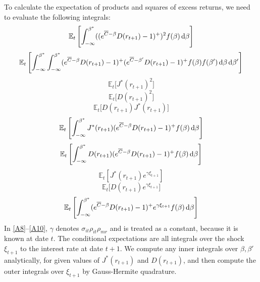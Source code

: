 \documentclass[12pt]{scrarticle}
\begin{document}
\begin{appendices}
To calculate the expectation of products and squares of excess returns, we need to evaluate the following integrals:
\begin{equation} 
    \mathbb{E}_t\left[\int_{-\infty}^{\beta^*} ((e^{\overline{C}-\beta}  D(r_{t+1}) - 1)^+)^2 f(\beta)\,\mathrm{d} \beta\right]
    \end{equation}
\begin{equation}
    \mathbb{E}_t\left[\int_{-\infty}^{\beta^*} \int_{-\infty}^{\beta^*} (e^{\overline{C}-\beta}  D(r_{t+1}) - 1)^+ (e^{ \overline{C}-\beta'} D(r_{t+1}) - 1)^+f(\beta)f(\beta')\,\mathrm{d} \beta \,\mathrm{d} \beta'\right]
\end{equation}
\begin{equation}
    \mathbb{E}_t\big[J^*(r_{t+1})^2\big] 
    \end{equation}
\begin{equation}
    \mathbb{E}_t\big[D(r_{t+1})^2\big] 
    \end{equation}
\begin{equation}
    \mathbb{E}_t\big[D(r_{t+1}) J^*(r_{t+1})\big]
    \end{equation}
\begin{equation}
    \mathbb{E}_t\left[\int_{-\infty}^{\beta^*} J^*(r_{t+1}) (e^{\overline{C}-\beta}  D(r_{t+1}) - 1)^+f(\beta)\,\mathrm{d} \beta\right]
    \end{equation}
\begin{equation}
    \mathbb{E}_t\left[\int_{-\infty}^{\beta^*} D(r_{t+1}) (e^{\overline{C}-\beta}  D(r_{t+1}) - 1)^+f(\beta)\,\mathrm{d} \beta\right]
    \end{equation}
\begin{equation}\label{A8}
    \mathbb{E}_t\left[J^*(r_{t+1}) e^{\gamma \xi_{t+1}}\right]
    \end{equation}
\begin{equation}\label{A9}
    \mathbb{E}_t\big[D(r_{t+1}) e^{\gamma \xi_{t+1}}\big]
    \end{equation}
\begin{equation} \label{A10} 
    \mathbb{E}_t\left[\int_{-\infty}^{\beta^*} (e^{\overline{C}-\beta}  D(r_{t+1}) - 1)^+ e^{\gamma \xi_{t+1}}f(\beta)\,\mathrm{d} \beta\right]
\end{equation}
In \eqref{A8}--\eqref{A10}, $\gamma$ denotes $\sigma_{it}\rho_{it}\rho_{mr}$ and is treated as a constant, because it is known at date $t$. The conditional expectations are all integrals over the shock $\xi_{t+1}$ to the interest rate at date $t+1$. We compute any inner integrals over $\beta, \beta'$ analytically, for given values of $J^*(r_{t+1})$ and $D(r_{t+1})$, and then compute the outer integrals over $\xi_{t+1}$ by Gauss-Hermite quadrature.



\end{appendices}
\end{document}
